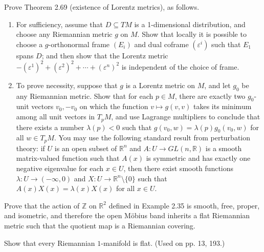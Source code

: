 \begin{exercise}\label{prob:lorentz-metric-existence}


Prove Theorem 2.69 (existence of Lorentz metrics), as follows.

\begin{enumerate}
\item[(a)] For sufficiency, assume that $D \subseteq TM$ is a 1-dimensional distribution, and choose any Riemannian metric $g$ on $M$. Show that locally it is possible to choose a $g$-orthonormal frame $(E_i)$ and dual coframe $(\varepsilon^i)$ such that $E_1$ spans $D$; and then show that the Lorentz metric $-(\varepsilon^1)^2 + (\varepsilon^2)^2 + \cdots + (\varepsilon^n)^2$ is independent of the choice of frame.

\item[(b)] To prove necessity, suppose that $g$ is a Lorentz metric on $M$, and let $g_0$ be any Riemannian metric. Show that for each $p \in M$, there are exactly two $g_0$-unit vectors $v_0, -v_0$ on which the function $v \mapsto g(v, v)$ takes its minimum among all unit vectors in $T_p M$, and use Lagrange multipliers to conclude that there exists a number $\lambda(p) < 0$ such that $g(v_0, w) = \lambda(p)g_0(v_0, w)$ for all $w \in T_p M$. You may use the following standard result from perturbation theory: if $U$ is an open subset of $\mathbb{R}^n$ and $A: U \to GL(n, \mathbb{R})$ is a smooth matrix-valued function such that $A(x)$ is symmetric and has exactly one negative eigenvalue for each $x \in U$, then there exist smooth functions $\lambda: U \to (-\infty, 0)$ and $X: U \to \mathbb{R}^n \setminus \{0\}$ such that $A(x)X(x) = \lambda(x)X(x)$ for all $x \in U$.
\end{enumerate}
\end{exercise}

\begin{exercise}\label{prob:mobius-band-metric}
Prove that the action of $\mathbb{Z}$ on $\mathbb{R}^2$ defined in Example 2.35 is smooth, free, proper, and isometric, and therefore the open Möbius band inherits a flat Riemannian metric such that the quotient map is a Riemannian covering.
\end{exercise}

\begin{exercise}\label{prob:riemannian-1-manifold-flat}
Show that every Riemannian $1$-manifold is flat. (Used on pp. 13, 193.)
\end{exercise}


